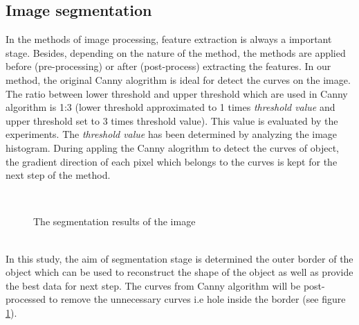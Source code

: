 \documentclass[twoside,twocolumn,10pt]{article}
\begin{document}
\subsection{Image segmentation}
In the methods of image processing, feature extraction is always a important stage. Besides, depending on the nature of the method, the methods are applied before (pre-processing) or after (post-process) extracting the features. In our method, the original Canny alogrithm\cite{canny} is ideal for detect the curves on the image. The ratio between lower threshold and upper threshold which are used in Canny algorithm is 1:3 (lower threshold approximated to 1 times \textit{threshold value} and upper threshold set to 3 times threshold value). This value is evaluated by the experiments. The \textit{threshold value} has been determined by analyzing the image histogram. During appling the Canny alogrithm to detect the curves of object, the gradient direction of each pixel which belongs to the curves is kept for the next step of the method. 
\begin{figure}[h]
\centering
{}~~
\caption{The segmentation results of the image}
\label{canny}
\end{figure}~\\[0.2cm]
In this study, the aim of segmentation stage is determined the outer border of the object which can be used to reconstruct the shape of the object as well as provide the best data for next step. The curves from Canny algorithm will be post-processed to remove the unnecessary curves i.e hole inside the border (see figure \ref{canny}). 
\end{document}
